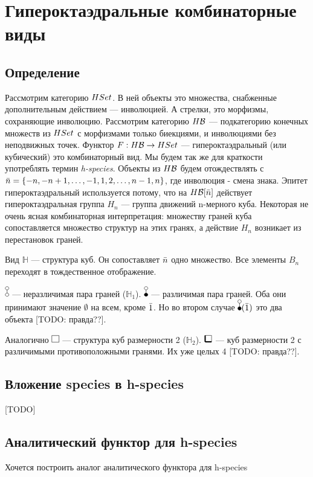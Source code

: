 \section{Гипероктаэдральные комбинаторные виды}
\subsection{Определение}
Рассмотрим категорию $HSet$. В ней объекты это множества, снабженные
дополнительным действием --- инволюцией. А стрелки, это морфизмы, сохраняющие инволюцию. 
Рассмотрим категорию $H\mathcal B$ --- подкатегорию конечных множеств из
$HSet$ с морфизмами только биекциями, и инволюциями без неподвижных точек.
Функтор $F:H\mathcal B \rightarrow HSet$ --- гипероктаэдральный (или кубический)
это комбинаторный вид. Мы будем так же для краткости употреблять термин
\emph{h-species}. Объекты из $H\mathcal B$ будем отождествлять с $\Bar n = \{-n, -n+1,
\dots, -1, 1, 2, \dots, n-1, n\}$, где инволюция - смена знака. Эпитет
гипероктаэдральный используется потому, что на $H\mathcal B[\Bar n]$ действует
гипероктаэдральная группа $H_n$ --- группа движений n-мерного куба.
Некоторая не очень ясная комбинаторная интерпретация: множеству граней куба
сопоставляется множество структур на этих гранях, а действие $H_n$ возникает из
перестановок граней.

\begin{example}
Вид $\mathbb H$ --- структура куб. Он сопоставляет $\Bar n$ одно множество. Все
элементы $B_n$ переходят в тождественное отображение.
\end{example}
\begin{example}
$\dA$ --- неразличимая пара граней ($\mathbb H_1$). $\dB$ --- различимая пара
граней.
Оба они принимают значение $\emptyset$ на всем, кроме $\Bar 1$. Но во втором случае
$\dB(\Bar 1)$ это два объекта [TODO: правда??].
\end{example}
\begin{example}
Аналогично $\dAA$ --- структура куб размерности 2 ($\mathbb H_2$). $\dBB$ ---
куб размерности 2 с различимыми противоположными гранями. Их уже целых 4 [TODO:
правда??].
\end{example}

\subsection{Вложение species в h-species}
[TODO]

\subsection{Аналитический функтор для h-species}
Хочется построить аналог аналитического функтора для h-species

